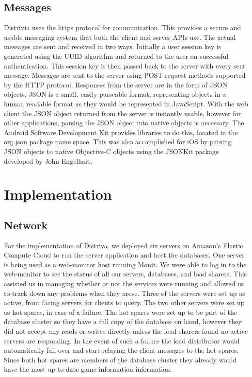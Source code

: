 \documentclass{dependencies/acm_proc_article-sp}
\begin{document}
\subsection{Messages}
Distrivia uses the https protocol for communication.
This provides a secure and usable messaging system that both the client and server APIs use.
The actual messages are sent and received in two ways.
Initially a user session key is generated using the UUID\cite{uuid} algorithm and returned to the user on successful authentication.
This session key is then passed back to the server with every sent message.
Messages are sent to the server using POST request methods supported by the HTTP protocol.
Responses from the server are in the form of JSON \cite{json} objects.
JSON is a small, easily-parseable format, representing objects in a human readable format as they would be represented in JavaScript.
With the web client the JSON object returned from the server is instantly usable, however for other applications, parsing the JSON object into native objects is necessary.
The Android Software Development Kit provides libraries to do this, located in the org.json \cite{orgjson} package name space.
This was also accomplished for iOS by parsing JSON objects to native Objective-C objects using the JSONKit \cite{objcjson} package developed by John Engelhart.

\section{Implementation}
\subsection{Network}
For the implementation of Distriva, we deployed six servers on Amazon's Elastic Compute Cloud \cite{aec} to run the server application and host the databases.
One server is being used as a web-monitor host running Monit\cite{monit}.
We were able to log in to the web-monitor to see the status of all our servers, databases, and load sharers. 
This assisted us in managing whether or not the services were running and allowed us to track down any problems when they arose.
Three of the servers were set up as active, front facing servers for clients to query.
The two other servers were set up as hot spares, in case of a failure. 
The hot spares were set up to be part of the database cluster so they have a full copy of the database on hand, however they did not accept any reads or writes directly unless the load sharers found no active servers are responding. 
In the event of such a failure the load distributor would automatically fail over and start relaying the client messages to the hot spares. 
Since both hot spares are members of the database cluster they already would have the most up-to-date game information information.
\end{document}
